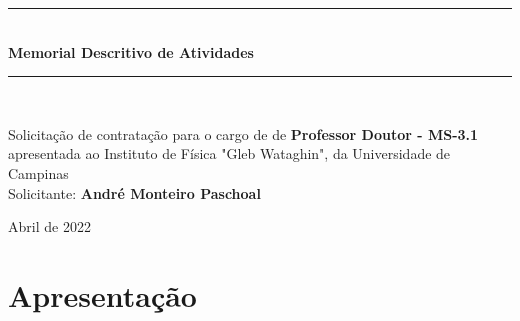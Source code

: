 \documentclass[a4paper,oneside,10pt]{article}
\begin{document}
\begin{titlepage}

\vspace{-5.0cm}


\begin{center}
\vspace{1cm}
\rule{1.0\textwidth}{1pt} \\ [0.5cm]
{\Huge \textbf{\textsf{Memorial Descritivo de Atividades}}} \\
\rule{1.0\textwidth}{1pt} \\
\vspace{2cm}

\doublespacing
{\Large \textsf{Solicita\c{c}\~{a}o de contratação para o cargo de de \textbf{Professor Doutor - MS-3.1} apresentada ao Instituto de Física "Gleb Wataghin", da Universidade de Campinas}}\\
\vspace{1.5cm}
{\LARGE \textsf{Solicitante: \textbf{André Monteiro Paschoal}}}\\
\vspace{0.5cm}

\vspace{2.0cm}

\normalsize \textsf{Abril de 2022}

\end{center}
\thispagestyle{empty}
\end{titlepage}


\tableofcontents


\newpage
\section*{Apresenta\c{c}\~{a}o}
\vspace{0.3cm}
\end{document}
